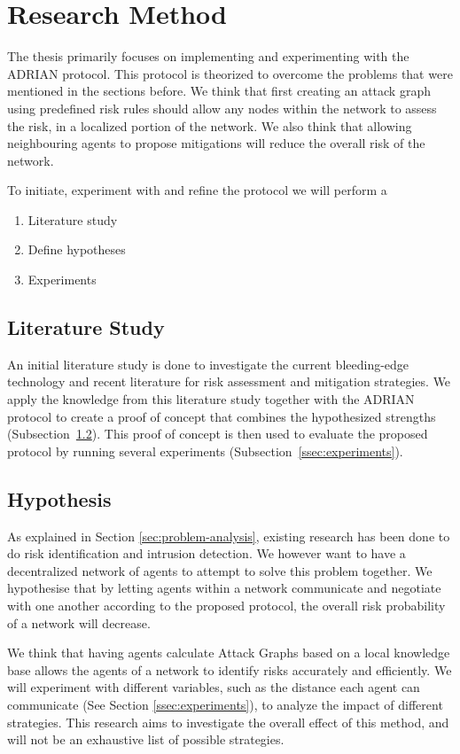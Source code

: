 \section{Research Method}
The thesis primarily focuses on implementing and experimenting with the ADRIAN protocol. This protocol is theorized to overcome the problems that were mentioned in the sections before. We think that first creating an attack graph using predefined risk rules should allow any nodes within the network to assess the risk, in a localized portion of the network. We also think that allowing neighbouring agents to propose mitigations will reduce the overall risk of the network. 

To initiate, experiment with and refine the protocol we will perform a 
\begin{enumerate}
    \item Literature study
    \item Define hypotheses
    \item Experiments
\end{enumerate}

\subsection{Literature Study}
An initial literature study is done to investigate the current bleeding-edge technology and recent literature for risk assessment and mitigation strategies. We apply the knowledge from this literature study together with the ADRIAN protocol to create a proof of concept that combines the hypothesized strengths (Subsection~\ref{ssec:hypothesis}). This proof of concept is then used to evaluate the proposed protocol by running several experiments (Subsection~\ref{ssec:experiments}).

\subsection{Hypothesis} \label{ssec:hypothesis}
As explained in Section \ref{sec:problem-analysis}, existing research has been done to do risk identification and intrusion detection. We however want to have a decentralized network of agents to attempt to solve this problem together. We hypothesise that by letting agents within a network communicate and negotiate with one another according to the proposed protocol, the overall risk probability of a network will decrease. 

We think that having agents calculate Attack Graphs based on a local knowledge base allows the agents of a network to identify risks accurately and efficiently. We will experiment with different variables, such as the distance each agent can communicate (See Section \ref{ssec:experiments}), to analyze the impact of different strategies. This research aims to investigate the overall effect of this method, and will not be an exhaustive list of possible strategies. 

